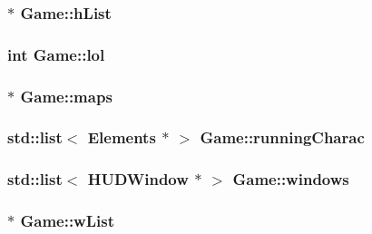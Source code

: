 \hypertarget{class_game_a5625cb138092a97f084bd65c0e0af173}{
\subsubsection[{h\-List}]{ $\ast$ Game\-::h\-List\hspace{0.3cm}{\ttfamily [static]}}}\label{class_game_a5625cb138092a97f084bd65c0e0af173}
\hypertarget{class_game_ac52883575849c7580b0b9dba48aef174}{
\subsubsection[{lol}]{\setlength{\rightskip}{0pt plus 5cm}int Game\-::lol\hspace{0.3cm}{\ttfamily [static]}}}\label{class_game_ac52883575849c7580b0b9dba48aef174}
\hypertarget{class_game_adef62d41374c1440a78855c7f9994697}{
\subsubsection[{maps}]{$\ast$ Game\-::maps}}\label{class_game_adef62d41374c1440a78855c7f9994697}
\hypertarget{class_game_a80912de3bec452b5a8df21650422d20a}{
\subsubsection[{running\-Charac}]{\setlength{\rightskip}{0pt plus 5cm}std\-::list$<$ {\bf Elements} $\ast$ $>$ Game\-::running\-Charac\hspace{0.3cm}{\ttfamily [static]}}}\label{class_game_a80912de3bec452b5a8df21650422d20a}
\hypertarget{class_game_afa3edaf9ec297d522ea19cd48c77a53a}{
\subsubsection[{windows}]{\setlength{\rightskip}{0pt plus 5cm}std\-::list$<$ {\bf H\-U\-D\-Window} $\ast$ $>$ Game\-::windows\hspace{0.3cm}{\ttfamily [static]}}}\label{class_game_afa3edaf9ec297d522ea19cd48c77a53a}
\hypertarget{class_game_afa1de8c59db49bc9239f6bb87465351b}{
\subsubsection[{w\-List}]{ $\ast$ Game\-::w\-List\hspace{0.3cm}{\ttfamily [static]}}}\label{class_game_afa1de8c59db49bc9239f6bb87465351b}


